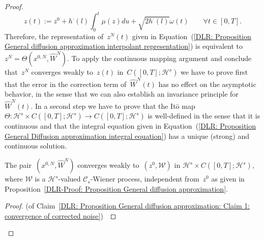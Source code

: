 \begin{proof}
  \begin{equation}
    \label{DLR: Proposition General Diffusion approximation integral equation}
   z(t) := z^0 + h^{\cdot}(l) \int_0^t \mu(z) du + \sqrt{2 h^{\cdot}(l)} \omega(t) \qquad \forall t \in [0,T].
  \end{equation}
  Therefore, the representation of~$z^N(t)$ given in Equation~(\ref{DLR: Proposition General diffusion approximation interpolant representation}) is equivalent to~$z^N = \Theta (x^{0,N}, \widehat{W}^N )$. To apply the continuous mapping argument and conclude that~$z^N $ converges weakly to~$ z(t)$ in~$ C([0,T]; \mathcal{H}^s)$ we have to prove first that the error in the correction term of~$\widehat{W}^N(t)$ has no effect on the asymptotic behavior, in the sense that we can also establish an invariance principle for~$\widehat{W}^N(t)$. In a second step we have to prove that the It\={o} map~$\Theta : \mathcal{H}^s \times C([0,T]; \mathcal{H}^s) \to  C([0,T]; \mathcal{H}^s)$ is well-defined in the sense that it is continuous and that the integral equation given in Equation~(\ref{DLR: Proposition General Diffusion approximation integral equation}) has a unique (strong) and continuous solution.
  
  \begin{claim}
   \label{DLR: Proposition General diffusion approximation: Claim 1: convergence of corrected noise}
   The pair~$(x^{0,N}, \widehat{W}^N)$ converges weakly to~$(z^0, \mathcal{W})$ in $\mathcal{H}^s \times C([0,T]; \mathcal{H}^s)$, where $\mathcal{W}$ is a $\mathcal{H}^s$-valued $\mathcal{C}_s$-Wiener process, independent from~$z^0$ as given in Proposition~\ref{DLR-Proof: Proposition General diffusion approximation}.
  \end{claim}
  \begin{proof}(of Claim~\ref{DLR: Proposition General diffusion approximation: Claim 1: convergence of corrected noise})~\autocite[Proposition 3.1]{Pillai2012}
    

\end{proof}
\end{proof}

